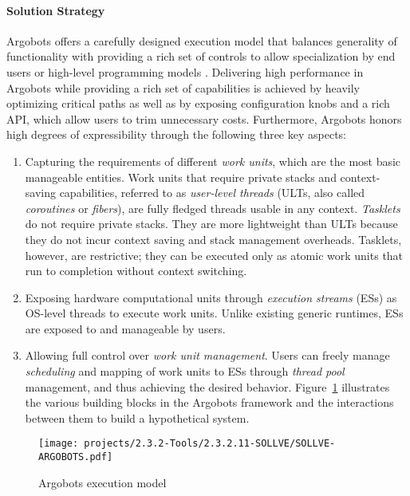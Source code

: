 \paragraph{Solution Strategy}

Argobots offers a carefully designed execution model that balances
generality of functionality with providing a rich set of controls to
allow specialization by end users or high-level programming models
\cite{seo2018}.  Delivering high performance in Argobots while
providing a rich set of capabilities is achieved by heavily optimizing
critical paths as well as by exposing configuration knobs and a rich
API, which allow users to trim unnecessary costs. Furthermore,
Argobots honors high degrees of expressibility through the following
three key aspects:

\begin{enumerate}

\item Capturing the requirements of different \emph{work units}, which
are the most basic manageable entities. Work units that require
private stacks and context-saving capabilities, referred to as
\textit{user-level threads} (ULTs, also called \textit{coroutines} or
\textit{fibers}), are fully fledged threads usable in any context.
\emph{Tasklets} do not require private stacks. They are more
lightweight than ULTs because they do not incur context saving and
stack management overheads.  Tasklets, however, are restrictive; they
can be executed only as atomic work units that run to completion
without context switching.

\item Exposing hardware computational units through \emph{execution
streams} (ESs) as OS-level threads to execute work units. Unlike
existing generic runtimes, ESs are exposed to and manageable by users.

\item Allowing full control over \emph{work unit management}.  Users
can freely manage \emph{scheduling} and mapping of work units to ESs
through \emph{thread pool} management, and thus achieving the desired
behavior. Figure~\ref{fig:sollve-argobots} illustrates the various
building blocks in the Argobots framework and the interactions between
them to build a hypothetical system.

\end{enumerate}

\begin{figure}[htb]
  \centering
  \texttt{[image: projects/2.3.2-Tools/2.3.2.11-SOLLVE/SOLLVE-ARGOBOTS.pdf]}
  \caption{\label{fig:sollve-argobots}Argobots execution model}
\end{figure}

